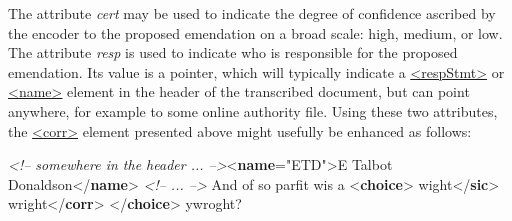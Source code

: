 The attribute {\itshape cert} may be used to indicate the degree of confidence ascribed by the encoder to the proposed emendation on a broad scale: high, medium, or low. The attribute {\itshape resp} is used to indicate who is responsible for the proposed emendation. Its value is a pointer, which will typically indicate a \hyperref[TEI.respStmt]{<respStmt>} or \hyperref[TEI.name]{<name>} element in the header of the transcribed document, but can point anywhere, for example to some online authority file. Using these two attributes, the \hyperref[TEI.corr]{<corr>} element presented above might usefully be enhanced as follows: \par\bgroup{}\exampleFont \begin{shaded}\noindent\mbox{}\mbox{}\newline 
\textit{<!-- somewhere in the header ... -->}{<\textbf{name}\hspace*{1em}{xml:id}="{ETD}">}E Talbot Donaldson{</\textbf{name}>}\mbox{}\newline 
\textit{<!-- ... -->} And of so parfit wis a {<\textbf{choice}>}\mbox{}\newline 
{}wight{</\textbf{sic}>}\mbox{}\newline 
{}wright{</\textbf{corr}>}\mbox{}\newline 
{</\textbf{choice}>} ywroght? \end{shaded}\egroup\par \par
